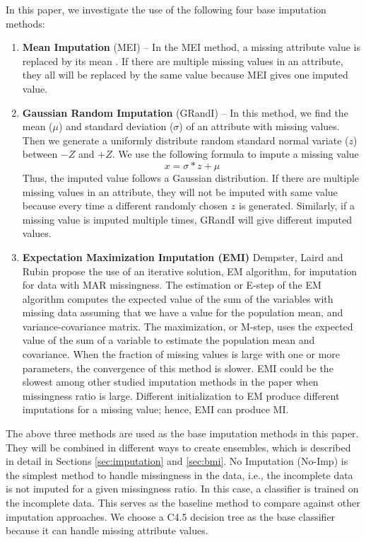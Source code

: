 \documentclass{iosart2c}
\begin{document}
In this paper, we investigate the use of the following four base imputation methods:

\begin{enumerate}
    \item \textbf{Mean Imputation} (MEI) -- In the MEI method, a missing attribute value is replaced by its mean \cite{khan2012bayesian}. If there are multiple missing values in an attribute, they all will be replaced by the same value because MEI gives one imputed value.
    
    \item  \textbf{Gaussian Random Imputation} (GRandI) -- In this method, we find the mean ($\mu$) and standard deviation ($\sigma$) of an attribute with missing values. Then we generate a uniformly distribute random standard normal variate ($z$) between $-Z$ and $+Z$. We use the following formula to impute a missing value
    \[ x = \sigma * z +  \mu \]
    Thus, the imputed value follows a Gaussian distribution. If there are multiple missing values in an attribute, they will not be imputed with same value because every time a different randomly chosen $z$ is generated. Similarly, if a missing value is imputed multiple times, GRandI will give different imputed values.

    \item  \textbf{Expectation Maximization Imputation (EMI)} Dempster, Laird and Rubin \cite{RubinMissingEMI} propose the use of an iterative solution, EM algorithm, for imputation for data with MAR missingness. The estimation or E-step of the EM algorithm computes the expected value of the sum of the variables with missing data assuming that we have a value for the population mean, and variance-covariance matrix. The maximization, or M-step, uses the expected value of the sum of a variable to estimate the population mean and covariance. When the fraction of missing values is large with one or more parameters, the convergence of this method is slower. EMI could be the slowest among other studied imputation methods in the paper when missingness ratio is large. Different initialization to EM produce different imputations for a missing value; hence, EMI can produce MI. 

\end{enumerate}

The above three methods are used as the base imputation methods in this paper. They will be combined in different ways to create ensembles, which is described in detail in Sections \ref{sec:imputation} and \ref{sec:bmi}. 
No Imputation (No-Imp) is the simplest method to handle missingness in the data, i.e., the incomplete data is not imputed for a given missingness ratio. In this case, a classifier is trained on the incomplete data. This serves as the baseline method to compare against other imputation approaches. We choose a C4.5 decision tree as the base classifier because it can handle missing attribute values.
\end{document}
